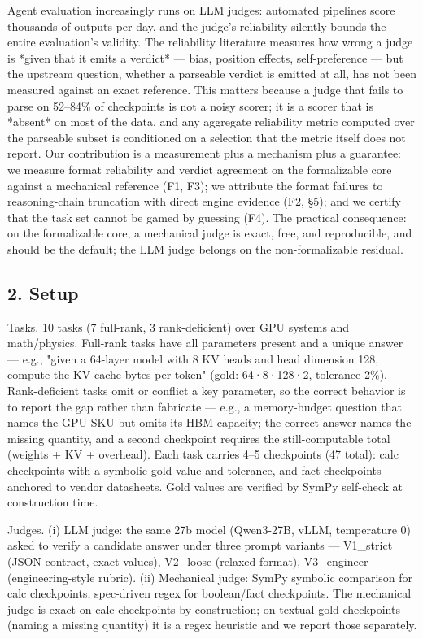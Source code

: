 \documentclass[10pt]{article}
\begin{document}
Agent evaluation increasingly runs on LLM judges: automated pipelines score thousands of outputs per day, and the judge's reliability silently bounds the entire evaluation's validity. The reliability literature measures how wrong a judge is *given that it emits a verdict* — bias, position effects, self-preference — but the upstream question, whether a parseable verdict is emitted at all, has not been measured against an exact reference. This matters because a judge that fails to parse on 52–84\% of checkpoints is not a noisy scorer; it is a scorer that is *absent* on most of the data, and any aggregate reliability metric computed over the parseable subset is conditioned on a selection that the metric itself does not report. Our contribution is a measurement plus a mechanism plus a guarantee: we measure format reliability and verdict agreement on the formalizable core against a mechanical reference (F1, F3); we attribute the format failures to reasoning-chain truncation with direct engine evidence (F2, §5); and we certify that the task set cannot be gamed by guessing (F4). The practical consequence: on the formalizable core, a mechanical judge is exact, free, and reproducible, and should be the default; the LLM judge belongs on the non-formalizable residual.

\subsection*{2. Setup}

Tasks. 10 tasks (7 full-rank, 3 rank-deficient) over GPU systems and math/physics. Full-rank tasks have all parameters present and a unique answer — e.g., "given a 64-layer model with 8 KV heads and head dimension 128, compute the KV-cache bytes per token" (gold: 64·8·128·2, tolerance 2\%). Rank-deficient tasks omit or conflict a key parameter, so the correct behavior is to report the gap rather than fabricate — e.g., a memory-budget question that names the GPU SKU but omits its HBM capacity; the correct answer names the missing quantity, and a second checkpoint requires the still-computable total (weights + KV + overhead). Each task carries 4–5 checkpoints (47 total): calc checkpoints with a symbolic gold value and tolerance, and fact checkpoints anchored to vendor datasheets. Gold values are verified by SymPy self-check at construction time.

Judges. (i) LLM judge: the same 27b model (Qwen3-27B, vLLM, temperature 0) asked to verify a candidate answer under three prompt variants — V1\_strict (JSON contract, exact values), V2\_loose (relaxed format), V3\_engineer (engineering-style rubric). (ii) Mechanical judge: SymPy symbolic comparison for calc checkpoints, spec-driven regex for boolean/fact checkpoints. The mechanical judge is exact on calc checkpoints by construction; on textual-gold checkpoints (naming a missing quantity) it is a regex heuristic and we report those separately.
\end{document}
